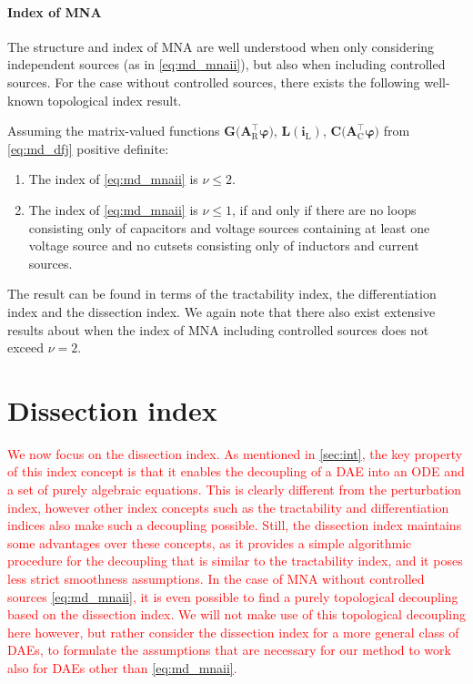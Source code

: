 \documentclass[AMA,STIX1COL]{WileyNJD-v2}
\newcommand{\mb}[1]{\mathbf{#1}}
\newcommand{\mr}[1]{\mathrm{#1}}
\newcommand{\T}{{\!\top}}
\newcommand{\AT}[1]{\mb{A}_\mr{#1}^{\T}}
\newcommand{\vphi}{\boldsymbol{\varphi}}
\renewcommand{\i}[1]{\mb{i}_\mr{#1}}
\begin{document}
\paragraph{Index of MNA}
The structure and index of MNA are well understood when only considering independent sources\cite{tischendorf1999} (as in \eqref{eq:md_mnaii}), but also when including controlled sources\cite{estevez2000ijcta}. For the case without controlled sources, there exists the following well-known topological index result.
\begin{theorem}
    \label{th:ic_imna}
    Assuming the matrix-valued functions $\mb{G} \big( \AT{R} \vphi \big)$, $\mb{L}(\i{L})$, $\mb{C} \big( \AT{C} \vphi \big)$ from \eqref{eq:md_dfj} positive definite:
    \begin{enumerate}
        \item The index of \eqref{eq:md_mnaii} is $\nu \leq 2$.
        \item The index of \eqref{eq:md_mnaii} is $\nu \leq 1$, if and only if there are no loops consisting only of capacitors and voltage sources containing at least one voltage source and no cutsets consisting only of inductors and current sources.
    \end{enumerate}
\end{theorem}
The result can be found in terms of the tractability index\cite{tischendorf1999}, the differentiation index\cite{estevez2000ijcta} and the dissection index\cite{jansen2014}. We again note that there also exist extensive results about when the index of MNA including controlled sources does not exceed $\nu = 2$\cite{estevez2000ijcta}.

\section{Dissection index}
\label{sec:di}
\textcolor{red}{We now focus on the dissection index. As mentioned in \autoref{sec:int}, the key property of this index concept is that it enables the decoupling of a DAE into an ODE and a set of purely algebraic equations. This is clearly different from the perturbation index, however other index concepts such as the tractability and differentiation indices also make such a decoupling possible. Still, the dissection index maintains some advantages over these concepts, as it provides a simple algorithmic procedure for the decoupling that is similar to the tractability index, and it poses less strict smoothness assumptions. In the case of MNA without controlled sources \eqref{eq:md_mnaii}, it is even possible to find a purely topological decoupling based on the dissection index\cite{jansen2014}. We will not make use of this topological decoupling here however, but rather consider the dissection index for a more general class of DAEs, to formulate the assumptions that are necessary for our method to work also for DAEs other than \eqref{eq:md_mnaii}.}
\end{document}
